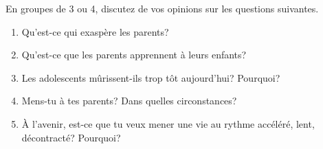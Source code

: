 \begin{frame}{}
  En groupes de 3 ou 4, discutez de vos opinions sur les questions suivantes.
  \begin{enumerate}
    \item Qu'est-ce qui exaspère les parents?
    \item Qu'est-ce que les parents apprennent à leurs enfants?
    \item Les adolescents mûrissent-ils trop tôt aujourd'hui? Pourquoi?
    \item Mens-tu à tes parents? Dans quelles circonstances?
    \item À l'avenir, est-ce que tu veux mener une vie au rythme accéléré, lent, décontracté? Pourquoi?
  \end{enumerate}
\end{frame}